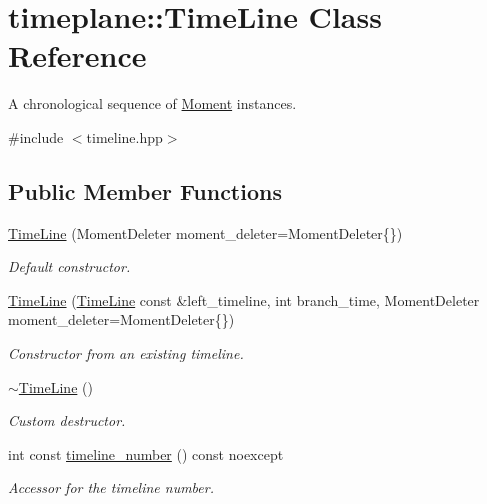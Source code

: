 \hypertarget{classtimeplane_1_1_time_line}{}\section{timeplane\+:\+:Time\+Line Class Reference}
\label{classtimeplane_1_1_time_line}


A chronological sequence of {\ttfamily \hyperlink{classtimeplane_1_1_moment}{Moment}} instances.  




{\ttfamily \#include $<$timeline.\+hpp$>$}

\subsection*{Public Member Functions}
\begin{DoxyCompactItemize}
\item 
\hyperlink{classtimeplane_1_1_time_line_afacd08f817ddae17b1dea9c1989f74ae}{Time\+Line} (Moment\+Deleter moment\+\_\+deleter=Moment\+Deleter\{\})
\begin{DoxyCompactList}\small\item\em Default constructor. \end{DoxyCompactList}\item 
\hyperlink{classtimeplane_1_1_time_line_a5e9a864bc9838c82dc3e5a50e69ece9b}{Time\+Line} (\hyperlink{classtimeplane_1_1_time_line}{Time\+Line} const \&left\+\_\+timeline, int branch\+\_\+time, Moment\+Deleter moment\+\_\+deleter=Moment\+Deleter\{\})
\begin{DoxyCompactList}\small\item\em Constructor from an existing timeline. \end{DoxyCompactList}\item 
\hyperlink{classtimeplane_1_1_time_line_a2d16c3db644a5e8dc4c0f12622c6a4e6}{$\sim$\+Time\+Line} ()
\begin{DoxyCompactList}\small\item\em Custom destructor. \end{DoxyCompactList}\item 
int const \hyperlink{classtimeplane_1_1_time_line_a4297da8acc6fbee73bfc7db0de2f80a5}{timeline\+\_\+number} () const noexcept
\begin{DoxyCompactList}\small\item\em Accessor for the timeline number. \end{DoxyCompactList}\item 

\end{DoxyCompactItemize}
